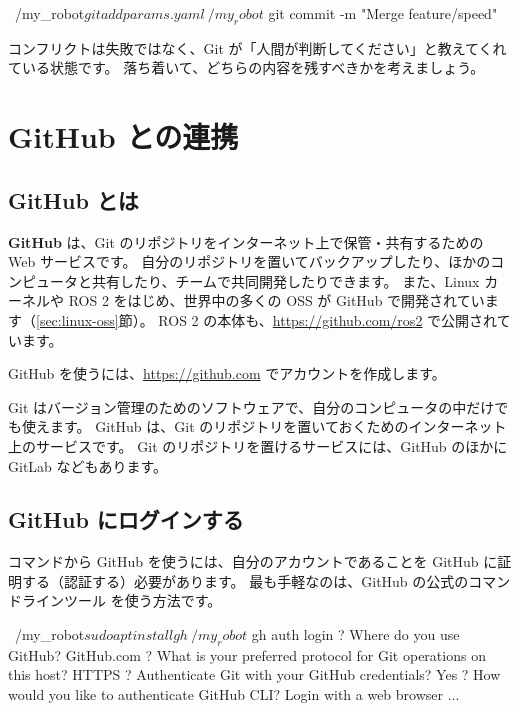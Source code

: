 \begin{terminal}[コンフリクトを解決してマージを完了する]
~/my_robot$ git add params.yaml
~/my_robot$ git commit -m "Merge feature/speed"
\end{terminal}

コンフリクトは失敗ではなく、Git が「人間が判断してください」と教えてくれている状態です。
落ち着いて、どちらの内容を残すべきかを考えましょう。

\section{GitHub との連携}
\label{sec:git-github}

\subsection{GitHub とは}

\textbf{GitHub} は、Git のリポジトリをインターネット上で保管・共有するための Web サービスです。
自分のリポジトリを置いてバックアップしたり、ほかのコンピュータと共有したり、チームで共同開発したりできます。
また、Linux カーネルや ROS 2 をはじめ、世界中の多くの OSS が GitHub で開発されています（\ref{sec:linux-oss}節）。
ROS 2 の本体も、\url{https://github.com/ros2} で公開されています。

GitHub を使うには、\url{https://github.com} でアカウントを作成します。

\begin{point}
  Git はバージョン管理のためのソフトウェアで、自分のコンピュータの中だけでも使えます。
  GitHub は、Git のリポジトリを置いておくためのインターネット上のサービスです。
  Git のリポジトリを置けるサービスには、GitHub のほかに GitLab などもあります。
\end{point}

\subsection{GitHub にログインする}

コマンドから GitHub を使うには、自分のアカウントであることを GitHub に証明する（認証する）必要があります。
最も手軽なのは、GitHub の公式のコマンドラインツール  を使う方法です。

\begin{terminal}
~/my_robot$ sudo apt install gh
~/my_robot$ gh auth login
? Where do you use GitHub? GitHub.com
? What is your preferred protocol for Git operations on this host? HTTPS
? Authenticate Git with your GitHub credentials? Yes
? How would you like to authenticate GitHub CLI? Login with a web browser
...
\end{terminal}

